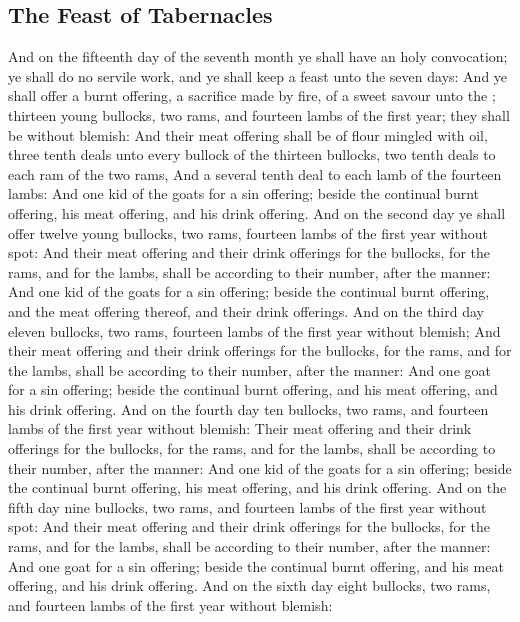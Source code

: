 \begin{biblechapter}
\section*{The Feast of Tabernacles}
\verse And on the fifteenth day of the seventh month ye shall have an holy convocation; ye shall do no servile work, and ye shall keep a feast unto the \LORD seven days:
\verse And ye shall offer a burnt offering, a sacrifice made by fire, of a sweet savour unto the \LORD; thirteen young bullocks, two rams, and fourteen lambs of the first year; they shall be without blemish:
\verse And their meat offering shall be of flour mingled with oil, three tenth deals unto every bullock of the thirteen bullocks, two tenth deals to each ram of the two rams,
\verse And a several tenth deal to each lamb of the fourteen lambs:
\verse And one kid of the goats for a sin offering; beside the continual burnt offering, his meat offering, and his drink offering.
\verse And on the second day ye shall offer twelve young bullocks, two rams, fourteen lambs of the first year without spot:
\verse And their meat offering and their drink offerings for the bullocks, for the rams, and for the lambs, shall be according to their number, after the manner:
\verse And one kid of the goats for a sin offering; beside the continual burnt offering, and the meat offering thereof, and their drink offerings.
\verse And on the third day eleven bullocks, two rams, fourteen lambs of the first year without blemish;
\verse And their meat offering and their drink offerings for the bullocks, for the rams, and for the lambs, shall be according to their number, after the manner:
\verse And one goat for a sin offering; beside the continual burnt offering, and his meat offering, and his drink offering.
\verse And on the fourth day ten bullocks, two rams, and fourteen lambs of the first year without blemish:
\verse Their meat offering and their drink offerings for the bullocks, for the rams, and for the lambs, shall be according to their number, after the manner:
\verse And one kid of the goats for a sin offering; beside the continual burnt offering, his meat offering, and his drink offering.
\verse And on the fifth day nine bullocks, two rams, and fourteen lambs of the first year without spot:
\verse And their meat offering and their drink offerings for the bullocks, for the rams, and for the lambs, shall be according to their number, after the manner:
\verse And one goat for a sin offering; beside the continual burnt offering, and his meat offering, and his drink offering.
\verse And on the sixth day eight bullocks, two rams, and fourteen lambs of the first year without blemish:

\end{biblechapter}
